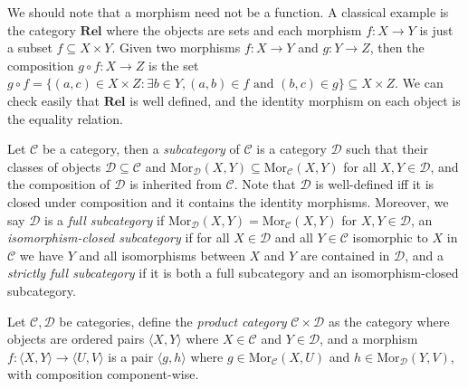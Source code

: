 \documentclass[11pt]{book}
\begin{document}
\begin{example}We should note that a morphism need not be a function. A classical example is the category $\mathbf{Rel}$ where the objects are sets and each morphism $f:X\rightarrow Y$ is just a subset $f\subseteq X\times Y$. Given two morphisms $f:X\rightarrow Y$ and $g:Y\rightarrow Z$, then the composition $g\circ f:X\rightarrow Z$ is the set $g\circ f=\{(a,c)\in X\times Z:\exists b\in Y,(a,b)\in f\textrm{\ and\ }(b,c)\in g\}\subseteq X\times Z$. We can check easily that $\mathbf{Rel}$ is well defined, and the identity morphism on each object is the equality relation.
\end{example}
\begin{definition}Let $\mathcal C$ be a category, then a \textit{subcategory} of $\mathcal C$ is a category $\mathcal D$ such that their classes of objects $\mathcal D\subseteq\mathcal C$ and $\mathrm{Mor}_{\mathcal D}(X,Y)\subseteq \mathrm{Mor}_{\mathcal C}(X,Y)$ for all $X,Y\in\mathcal D$, and the composition of $\mathcal D$ is inherited from $\mathcal C$. Note that $\mathcal D$ is well-defined iff it is closed under composition and it contains the identity morphisms. Moreover, we say $\mathcal D$ is a \textit{full subcategory} if $\mathrm{Mor}_{\mathcal D}(X,Y)=\mathrm{Mor}_{\mathcal C}(X,Y)$ for $X,Y\in\mathcal D$, an \textit{isomorphism-closed subcategory} if for all $X\in\mathcal D$ and all $Y\in \mathcal C$ isomorphic to $X$ in $\mathcal C$ we have $Y$ and all isomorphisms between $X$ and $Y$ are contained in $\mathcal D$, and a \textit{strictly full subcategory} if it is both a full subcategory and an isomorphism-closed subcategory.
\end{definition}
\begin{definition}Let $\mathcal C,\mathcal D$ be categories, define the \textit{product category} $\mathcal C\times\mathcal D$ as the category where objects are ordered pairs $\langle X,Y\rangle$ where $X\in\mathcal C$ and $Y\in\mathcal D$, and a morphism $f:\langle X,Y\rangle\rightarrow \langle U,V\rangle$ is a pair $\langle g,h\rangle$ where $g\in\mathrm{Mor}_{\mathcal C}(X,U)$ and $h\in \mathrm{Mor}_{\mathcal D}(Y,V)$, with composition component-wise.
\end{definition}
\end{document}
